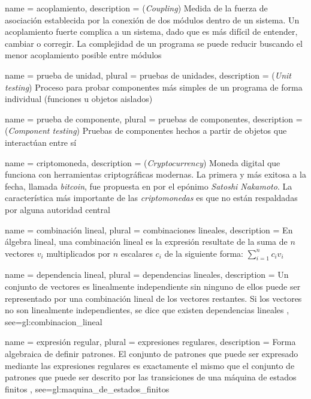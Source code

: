 {
  name = acoplamiento,
  description = {
    (\textit{Coupling}) Medida de la fuerza de asociación establecida por
    la conexión de dos módulos dentro de un sistema. Un acoplamiento
    fuerte complica a un sistema, dado que es más difícil de entender,
    cambiar o corregir. La complejidad de un programa se puede reducir
    buscando el menor acoplamiento posible entre módulos
    \cite{DBLP:books/daglib/0019905}%
  }
}

{
  name = prueba de unidad,
  plural = pruebas de unidades,
  description = {
    (\textit{Unit testing}) Proceso para probar componentes más simples de un
    programa de forma individual (funciones u objetos aislados)
    \cite{DBLP:books/lib/Sommerville07}%
  }
}

{
  name = prueba de componente,
  plural = pruebas de componentes,
  description = {
    (\textit{Component testing}) Pruebas de componentes hechos a partir de
    objetos que interactúan entre sí
    \cite{DBLP:books/lib/Sommerville07}%
  }
}

{
  name = criptomoneda,
  description = {
    (\textit{Cryptocurrency}) Moneda digital que funciona con herramientas
    criptográficas modernas. La primera y más exitosa a la fecha, llamada
    \textit{bitcoin}, fue propuesta en \cite{bitcoin} por el epónimo
    \textit{Satoshi Nakamoto}. La característica más importante de las
    \textit{criptomonedas} es que no están respaldadas por alguna autoridad
    central \cite{DBLP:journals/iacr/BhattacherjeeS17}%
  }
}

{
  name = combinación lineal,
  plural = combinaciones lineales,
  description = {
    En álgebra lineal, una combinación lineal es la expresión resultate
    de la suma de $n$ vectores $v_i$ multiplicados por $n$ escalares $c_i$
    de la siguiente forma: $\sum_{i=1}^{n}c_i v_i$%
  }
}

{
  name = dependencia lineal,
  plural = dependencias lineales,
  description = {
    Un conjunto de vectores es linealmente independiente sin ninguno de
    ellos puede ser representado por una combinación lineal de los vectores
    restantes.
    Si los vectores no son linealmente independientes, se dice que existen
    dependencias lineales%
  },
  see={gl:combinacion_lineal}
}

{
  name = expresión regular,
  plural = expresiones regulares,
  description = {
    Forma algebraica de definir patrones. El conjunto de patrones que puede ser
    expresado mediante las expresiones regulares es exactamente el mismo que el
    conjunto de patrones que puede ser descrito por las transiciones de una
    máquina de estados finitos \cite{DBLP:books/crc/AU1992}%
  },
  see={gl:maquina_de_estados_finitos}
}

